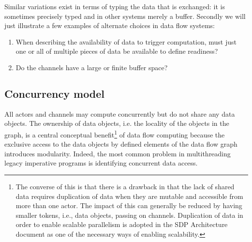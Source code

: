 \documentclass[11pt,a4paper]{article}
\begin{document}
Similar variations exist in terms of typing the data that is
exchanged: it is sometimes precisely typed and in other systems merely
a buffer. Secondly we will just illustrate a few examples of alternate
choices in data flow systems:
\begin{enumerate}
  \item When describing the availability of data
  to trigger computation, must just one or all of multiple pieces of
  data be available to define readiness?  
\item Do the channels have a large or finite buffer space?
\end{enumerate}

\subsection{Concurrency model}
 
All actors and channels may compute concurrently but do not share any
data objects. The ownership of data objects, i.e. the locality of the
objects in the graph, is a central conceptual benefit\footnote{The
  converse of this is that there is a drawback in that the lack of
  shared data requires duplication of data when they are mutable and
  accessible from more than one actor. The impact of this can
  generally be reduced by having smaller tokens, i.e., data objects,
  passing on channels. Duplication of data in order to enable scalable
  parallelism is adopted in the SDP Architecture document as one of
  the necessary ways of enabling scalability.} of data flow computing
because the exclusive access to the data objects by defined elements
of the data flow graph introduces modularity. Indeed, the most common
problem in multithreading legacy imperative programs is identifying
concurrent data access.
\end{document}
